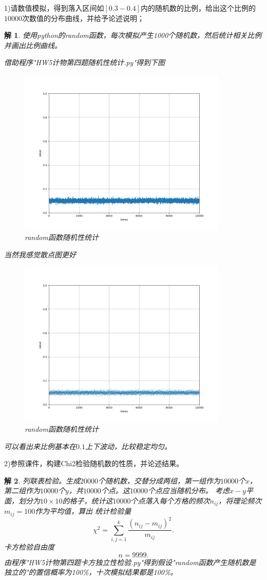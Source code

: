 \documentclass[10pt]{ctexart}
\newtheorem*{solution}{解}
\begin{document}
1)请数值模拟，得到落入区间如$[0.3-0.4]$内的随机数的比例，给出这个比例的$10000$次数值的分布曲线，并给予论述说明；
\begin{solution}
    使用python的random函数，每次模拟产生1000个随机数，然后统计相关比例并画出比例曲线。

    借助程序"HW5计物第四题随机性统计.py"得到下图
    \begin{figure}[H]
        \centering
        \includegraphics[width=10cm]{prob.png}
        \caption{random函数随机性统计}
    \end{figure}
    当然我感觉散点图更好
    \begin{figure}[H]
        \centering
        \includegraphics[width=10cm]{prob1.png}
        \caption{random函数随机性统计}
    \end{figure}
    可以看出来比例基本在$0.1$上下波动，比较稳定均匀。
\end{solution}
2)参照课件，构建Chi2检验随机数的性质，并论述结果。
\begin{solution}
    列联表检验。生成$20000$个随机数，交替分成两组，第一组作为$10000$个$x$，第二组作为$10000$个$y$，共$10000$个点。这$10000$个点应当随机分布。
    考虑$x-y$平面，划分为$10\times 10$的格子，统计这$10000$个点落入每个方格的频次$n_{ij}$，将理论频次$m_{ij}=100$作为平均值，算出
    统计检验量
    $$\chi^2=\sum\limits_{i,j=1}^{k}\frac{(n_{ij}-m_{ij})^2}{m_{ij}}.$$
    卡方检验自由度
    $$n=9999.$$
    由程序"HW5计物第四题卡方独立性检验.py"得到假设"random函数产生随机数是独立的"的置信概率为100\%，十次模拟结果都是100\%。
\end{solution}
\end{document}
